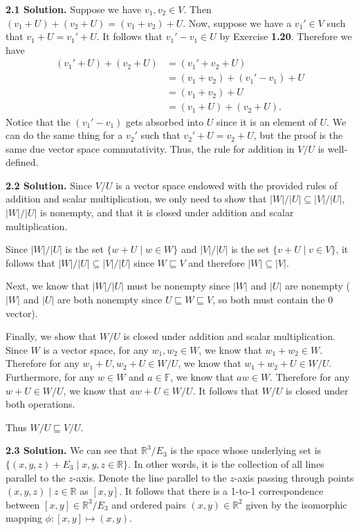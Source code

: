 \textbf{2.1 Solution.} Suppose we have $v_1,v_2\in V$. Then $(v_1+U)+(v_2+U) = (v_1+v_2)+U$. Now, suppose we have a $v_1'\in V$ such that $v_1+U = v_1'+U$. It follows that $v_1'-v_1\in U$ by Exercise \textbf{1.20}. Therefore we have
\begin{align*}
    (v_1'+U)+(v_2+U) &= (v_1'+v_2+U) \\
                     &= (v_1+v_2)+(v_1'-v_1)+U \\
                     &= (v_1+v_2)+U \\
                     &= (v_1+U)+(v_2+U).
\end{align*}
Notice that the $(v_1'-v_1)$ gets absorbed into $U$ since it is an element of $U$. We can do the same thing for a $v_2'$ such that $v_2'+U=v_2+U$, but the proof is the same due vector space commutativity. Thus, the rule for addition in $V/U$ is well-defined.

\textbf{2.2 Solution.} Since $V/U$ is a vector space endowed with the provided rules of addition and scalar multiplication, we only need to show that $|W|/|U|\subseteq|V|/|U|$, $|W|/|U|$ is nonempty, and that it is closed under addition and scalar multiplication.

Since $|W|/|U|$ is the set $\{w+U\mid w\in W\}$ and $|V|/|U|$ is the set $\{v+U\mid v\in V\}$, it follows that $|W|/|U|\subseteq|V|/|U|$ since $W\sqsubseteq V$ and therefore $|W|\subseteq|V|$.

Next, we know that $|W|/|U|$ must be nonempty since $|W|$ and $|U|$ are nonempty ($|W|$ and $|U|$ are both nonempty since $U\sqsubseteq W\sqsubseteq V$, so both must contain the $0$ vector).

Finally, we show that $W/U$ is closed under addition and scalar multiplication. Since $W$ is a vector space, for any $w_1,w_2\in W$, we know that $w_1+w_2\in W$. Therefore for any $w_1+U,w_2+U\in W/U$, we know that $w_1+w_2+U\in W/U$. Furthermore, for any $w\in W$ and $a\in\mathbb{F}$, we know that $aw\in W$. Therefore for any $w+U\in W/U$, we know that $aw+U\in W/U$. It follows that $W/U$ is closed under both operations.

Thus $W/U\sqsubseteq V/U$.

\textbf{2.3 Solution.} We can see that $\mathbb{R}^3/E_3$ is the space whose underlying set is $\{(x,y,z)+E_3\mid x,y,z\in\mathbb{R}\}$. In other words, it is the collection of all lines parallel to the $z$-axis. Denote the line parallel to the $z$-axis passing through points $(x,y,z)\mid z\in\mathbb{R}$ as $[x,y]$. It follows that there is a 1-to-1 correspondence between $[x,y]\in\mathbb{R}^3/E_3$ and ordered pairs $(x,y)\in\mathbb{R}^2$ given by the isomorphic mapping $\phi:[x,y]\mapsto(x,y)$.

